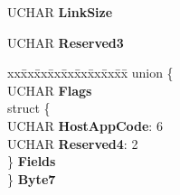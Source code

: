 \begin{DoxyCompactItemize}
\begin{tabbing}
\end{tabbing}\item 
\mbox{\label{struct___m_o_d_e___w_r_i_t_e___p_a_r_a_m_s___p_a_g_e___u_s_e_r_a6b873c3cd517b97ecb42f634bff1cc78}} 
U\+C\+H\+AR {\bfseries Link\+Size}
\item 
\mbox{\label{struct___m_o_d_e___w_r_i_t_e___p_a_r_a_m_s___p_a_g_e___u_s_e_r_af864fcc590cfb54edae34dcbe71280de}} 
U\+C\+H\+AR {\bfseries Reserved3}
\item 
\mbox{\label{struct___m_o_d_e___w_r_i_t_e___p_a_r_a_m_s___p_a_g_e___u_s_e_r_a0669756a3f42bcdc9e5cb52ef412eca0}} 
\begin{tabbing}
xx\=xx\=xx\=xx\=xx\=xx\=xx\=xx\=xx\=\kill
union \{\\
\>UCHAR {\bfseries Flags}\\
\>struct \{\\
\>\>UCHAR {\bfseries HostAppCode}: 6\\
\>\>UCHAR {\bfseries Reserved4}: 2\\
\>\} {\bfseries Fields}\\
\} {\bfseries Byte7}\\


\end{tabbing}
\end{DoxyCompactItemize}
